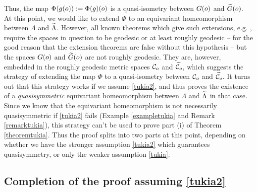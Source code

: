 {Thus, the map $\Phi(g(o)) := \Phi(g)(o)$ is a quasi-isometry between $G(o)$ and $\widetilde G(o)$. At this point, we would like to extend $\Phi$ to an equivariant homeomorphism between $\Lambda$ and $\widetilde\Lambda$. However, all known theorems which give such extensions, e.g. \cite[Theorem 6.5]{BonkSchramm}, require the spaces in question to be geodesic or at least roughly geodesic -- for the good reason that the extension theorems are false without this hypothesis -- but the spaces $G(o)$ and $\widetilde G(o)$ are not roughly geodesic. They are, however, embedded in the roughly geodesic metric spaces $\mathcal C_o$ and $\widetilde{\mathcal C}_o$, which suggests the strategy of extending the map $\Phi$ to a quasi-isometry between $\mathcal C_o$ and $\widetilde{\mathcal C}_o$. It turns out that this strategy works if we assume \eqref{tukia2}, and thus proves the existence of a \emph{quasisymmetric} equivariant homeomorphism between $\Lambda$ and $\widetilde\Lambda$ in that case. Since we know that the equivariant homeomorphism is not necessarily quasisymmetric if \eqref{tukia2} fails (Example \ref{exampletukia} and Remark \ref{remarktukia}), this strategy can't be used to prove part (i) of Theorem \ref{theoremtukia}. Thus the proof splits into two parts at this point, depending on whether we have the stronger assumption \eqref{tukia2} which guarantees quasisymmetry, or only the weaker assumption \eqref{tukia}.

\subsection{Completion of the proof assuming \eqref{tukia2}}

}

